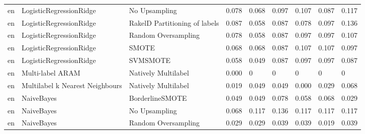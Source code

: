 \begin{tabular}{lllllllll}
      en &         LogisticRegressionRidge &                 No Upsampling &     0.078 &                     0.068 &                 0.097 &                  0.107 &                                   0.087 &     0.117 \\
      en &         LogisticRegressionRidge & RakelD Partitioning of labels &     0.087 &                     0.058 &                 0.087 &                  0.078 &                                   0.097 &     0.136 \\
      en &         LogisticRegressionRidge &           Random Oversampling &     0.078 &                     0.058 &                 0.087 &                  0.097 &                                   0.097 &     0.107 \\
      en &         LogisticRegressionRidge &                         SMOTE &     0.068 &                     0.068 &                 0.087 &                  0.107 &                                   0.107 &     0.097 \\
      en &         LogisticRegressionRidge &                      SVMSMOTE &     0.058 &                     0.049 &                 0.087 &                  0.097 &                                   0.097 &     0.087 \\
      en &                Multi-label ARAM &           Natively Multilabel &     0.000 &                         0 &                     0 &                      0 &                                       0 &         0 \\
      en & Multilabel k Nearest Neighbours &           Natively Multilabel &     0.019 &                     0.049 &                 0.049 &                  0.000 &                                   0.029 &     0.068 \\
      en &                      NaiveBayes &               BorderlineSMOTE &     0.049 &                     0.049 &                 0.078 &                  0.058 &                                   0.068 &     0.029 \\
      en &                      NaiveBayes &                 No Upsampling &     0.068 &                     0.117 &                 0.136 &                  0.117 &                                   0.117 &     0.117 \\
      en &                      NaiveBayes &           Random Oversampling &     0.029 &                     0.029 &                 0.039 &                  0.039 &                                   0.019 &     0.039 \\

\end{tabular}
